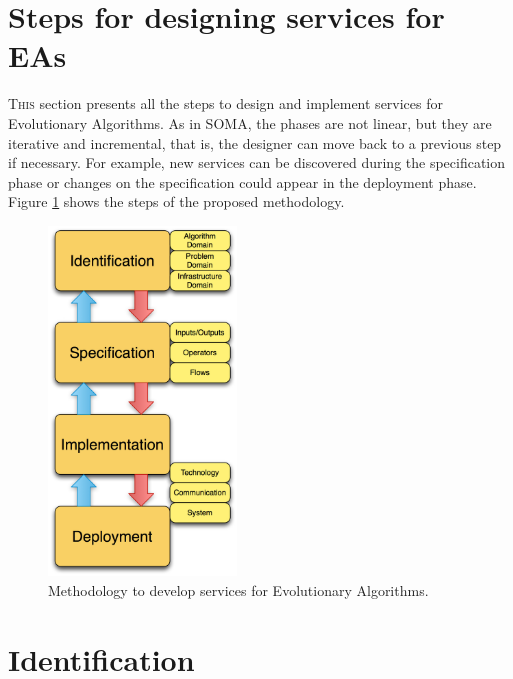 




\section{Steps for designing services for EAs}
\lettrine{T}{his} section presents all the steps to design and implement services for Evolutionary Algorithms.
 As in SOMA, the phases are not linear, but they are iterative and incremental, that is, the designer can move back to a previous step if necessary. For example,
 new services can be discovered during the specification phase or changes on the specification could appear in the deployment phase. Figure \ref{fig:distributed:methodology} shows the steps of the proposed methodology.

\begin{figure}
\centering
\includegraphics[width=5cm]{gfx/soaea/methodology.jpg}
\caption{Methodology to develop services for Evolutionary Algorithms.}
\label{fig:distributed:methodology}
\end{figure}

\section{Identification}
\label{subsec:soaea:identification}

